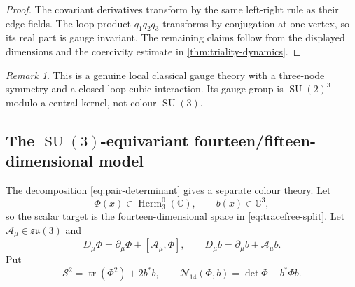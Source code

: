 \documentclass[11pt]{article}
\theoremstyle{definition}
\theoremstyle{remark}
\newtheorem{remark}[theorem]{Remark}
\newcommand{\C}{\mathbb C}
\newcommand{\Herm}{\operatorname{Herm}}
\newcommand{\tr}{\operatorname{tr}}
\newcommand{\SU}{\operatorname{SU}}
\newcommand{\cN}{\mathcal N}
\begin{document}
\begin{proof}
The covariant derivatives transform by the same left-right rule as their edge fields.  The loop product $q_1q_2q_3$ transforms by conjugation at one vertex, so its real part is gauge invariant.  The remaining claims follow from the displayed dimensions and the coercivity estimate in \cref{thm:triality-dynamics}.
\end{proof}

\begin{remark}
This is a genuine local classical gauge theory with a three-node symmetry and a closed-loop cubic interaction.  Its gauge group is $\SU(2)^3$ modulo a central kernel, not colour $\SU(3)$.
\end{remark}

\subsection{The \texorpdfstring{$\SU(3)$}{SU(3)}-equivariant fourteen/fifteen-dimensional model}

The decomposition \eqref{eq:pair-determinant} gives a separate colour theory.  Let
\[
 \Phi(x)\in\Herm_3^0(\C),
 \qquad b(x)\in\C^3,
\]
so the scalar target is the fourteen-dimensional space in \eqref{eq:tracefree-split}.  Let $\mathcal A_\mu\in\mathfrak{su}(3)$ and
\[
 D_\mu\Phi=\partial_\mu\Phi+[\mathcal A_\mu,\Phi],
 \qquad
 D_\mu b=\partial_\mu b+\mathcal A_\mu b.
\]
Put
\begin{equation}\label{eq:R14}
 \mathscr S^2=\tr(\Phi^2)+2b^*b,
 \qquad
 \cN_{14}(\Phi,b)=\det\Phi-b^*\Phi b.
\end{equation}
\end{document}
